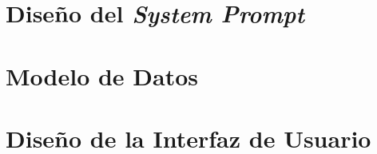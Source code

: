 \section{Diseño del \textit{System Prompt}}


\section{Modelo de Datos}


\section{Diseño de la Interfaz de Usuario}
